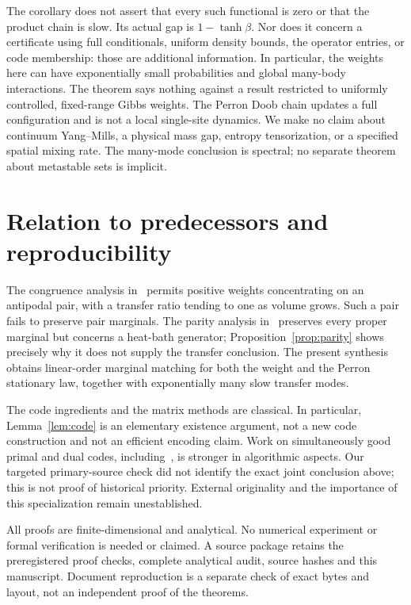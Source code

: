 \documentclass[11pt]{article}
\begin{document}
The corollary does not assert that every such functional is zero or that
the product chain is slow. Its actual gap is $1-\tanh\beta$. Nor does
it concern a certificate using full conditionals, uniform density bounds,
the operator entries, or code membership: those are additional information.
In particular, the weights here can have exponentially small probabilities
and global many-body interactions. The theorem says nothing against a
result restricted to uniformly controlled, fixed-range Gibbs weights.
The Perron Doob chain updates a full configuration and is not a local
single-site dynamics. We make no claim about continuum Yang--Mills,
a physical mass gap, entropy tensorization, or a specified spatial mixing
rate. The many-mode conclusion is spectral; no separate theorem about
metastable sets is implicit.

\section{Relation to predecessors and reproducibility}
The congruence analysis in~\cite{ErikssonCongruence} permits positive
weights concentrating on an antipodal pair, with a transfer ratio tending
to one as volume grows. Such a pair fails to preserve pair marginals.
The parity analysis in~\cite{ErikssonParity} preserves every proper
marginal but concerns a heat-bath generator; Proposition~\ref{prop:parity}
shows precisely why it does not supply the transfer conclusion.
The present synthesis obtains linear-order marginal matching for both
the weight and the Perron stationary law, together with exponentially
many slow transfer modes.

The code ingredients and the matrix methods are classical. In particular,
Lemma~\ref{lem:code} is an elementary existence argument, not a new code
construction and not an efficient encoding claim. Work on simultaneously
good primal and dual codes, including~\cite{BrehmResch}, is stronger in
algorithmic aspects. Our targeted primary-source check did not identify
the exact joint conclusion above; this is not proof of historical priority.
External originality and the importance of this specialization remain
unestablished.

All proofs are finite-dimensional and analytical. No numerical experiment
or formal verification is needed or claimed. A source package retains the
preregistered proof checks, complete analytical audit, source hashes and
this manuscript. Document reproduction is a separate check of exact bytes
and layout, not an independent proof of the theorems.
\end{document}

